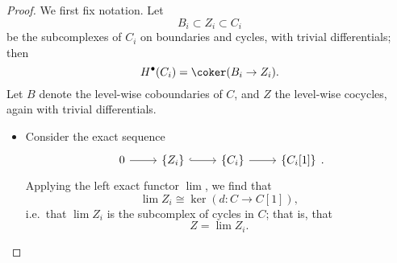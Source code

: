 \documentclass[main.tex]{subfiles}
\begin{document}
\begin{proof}
  We first fix notation. Let
  \begin{equation*}
    B_{i} \subset Z_{i} \subset C_{i}
  \end{equation*}
  be the subcomplexes of \(C_{i}\) on boundaries and cycles, with trivial differentials; then
  \begin{equation*}
    H^{\bullet}(C_{i}) = \coker (B_{i} \to Z_{i}).
  \end{equation*}
  Let \(B\) denote the level-wise coboundaries of \(C\), and \(Z\) the level-wise cocycles, again with trivial differentials.
  \begin{itemize}
    \item Consider the exact sequence
      \begin{equation*}
        \begin{tikzcd}
          0
          \arrow[r]
          & \{Z_{i}\}
          \arrow[r, hook]
          & \{C_{i}\}
          \arrow[r]
          & \{C_{i}[1]\}
        \end{tikzcd}.
      \end{equation*}
      Applying the left exact functor \(\lim\), we find that
      \begin{equation*}
        \lim Z_{i} \cong \ker(d\colon C \to C[1]),
      \end{equation*}
      i.e.\ that \(\lim Z_{i}\) is the subcomplex of cycles in \(C\); that is, that
      \begin{equation*}
        Z = \lim Z_{i}.
      \end{equation*}


\end{itemize}
\end{proof}
\end{document}
